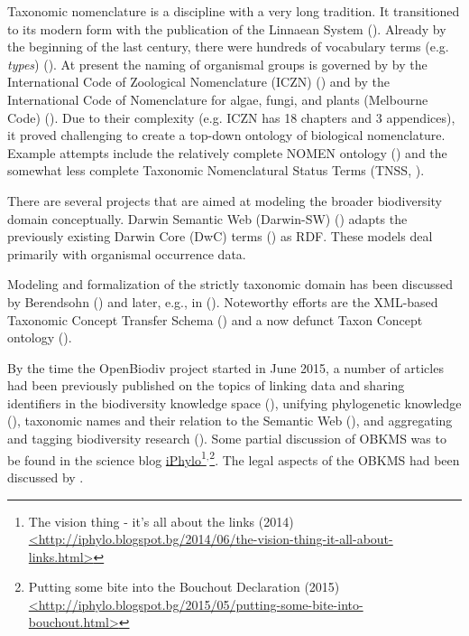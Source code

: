 {Taxonomic nomenclature is a discipline with a very long tradition.  It transitioned to its modern form with the publication of the Linnaean System (\cite{linnaeus_systema_1758}).  Already by the beginning of the last century, there were hundreds of vocabulary terms (e.g. \emph{types}) (\cite{witteveen_naming_2015}).  At present the naming of organismal groups is governed by by the International Code of Zoological Nomenclature (ICZN) (\cite{international_commission_on_zoological_nomenclature_international_1999}) and by the International Code of Nomenclature for algae, fungi, and plants (Melbourne Code) (\cite{mcneill_international_2012}).  Due to their complexity (e.g. ICZN has 18 chapters and 3 appendices), it proved challenging to create a top-down ontology of biological nomenclature. Example attempts include the relatively complete NOMEN ontology (\cite{dmitriev_nomen_2017}) and the somewhat less complete Taxonomic Nomenclatural Status Terms (TNSS, \cite{morris_taxonomic_nodate}).

There are several projects that are aimed at modeling the broader biodiversity domain conceptually. Darwin Semantic Web (Darwin-SW) (\cite{baskauf_darwin-sw:_2016}) adapts the previously existing Darwin Core (DwC) terms (\cite{wieczorek_darwin_2012}) as RDF. These models deal primarily with organismal occurrence data.

Modeling and formalization of the strictly taxonomic domain has been discussed by Berendsohn (\cite{berendsohn_concept_1995}) and later, e.g., in (\cite{franz_perspectives:_2009,sterner_taxonomy_2017}). Noteworthy efforts are the XML-based Taxonomic Concept Transfer Schema (\cite{taxonomic_names_and_concepts_interest_group_taxonomic_2006}) and a now defunct Taxon Concept ontology (\cite{devries_taxon_nodate}).

By the time the OpenBiodiv project started in June 2015, a number of articles had been previously published on the topics of linking data and sharing identifiers in the biodiversity knowledge space (\cite{page_biodiversity_2008}), unifying phylogenetic knowledge (\cite{parr_evolutionary_2012}), taxonomic names and their relation to the Semantic Web (\cite{page_taxonomic_2006,patterson_names_2010}), and aggregating and tagging biodiversity research (\cite{mindell_aggregating_2011}). Some partial discussion of OBKMS was to be found in the science blog \href{http://iphylo.blogspot.bg}{iPhylo}\footnote{The vision thing - it's all about the links (2014) \href{http://iphylo.blogspot.bg/2014/06/the-vision-thing-it-all-about-links.html}{<http://iphylo.blogspot.bg/2014/06/the-vision-thing-it-all-about-links.html>}}$^{,}$\footnote{Putting some bite into the Bouchout Declaration (2015) \href{http://iphylo.blogspot.bg/2015/05/putting-some-bite-into-bouchout.html}{<http://iphylo.blogspot.bg/2015/05/putting-some-bite-into-bouchout.html>}}. The legal aspects of the OBKMS had been discussed by \cite{egloff_open_2014}.

}
